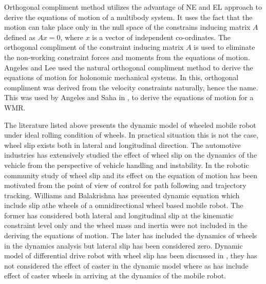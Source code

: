 Orthogonal compliment method utilizes the advantage of NE and EL approach to derive the equations of motion of  a multibody  system.  It uses the fact that the motion can take place only in the null space of the constrains inducing matrix $A$ defined as $Ax=0$, where $x$ is a vector of independent co-ordinates. The orthogonal compliment of the constraint inducing matrix $A$ is used to eliminate the non-working constraint  forces  and moments from the equations of motion.  Angeles and Lee \cite{angeles1988formulation} used the natural orthogonal compliment method to derive the equations of motion for holonomic mechanical systems. In this,  orthogonal compliment was derived from the velocity constraints naturally, hence the name. This was  used by Angeles \cite{angeles2013fundamentals} and Saha in \cite{saha1989kinematics},\cite{saha1991dynamics} to derive the equations of motion for a WMR. 

  The literature listed above presents the dynamic model of wheeled mobile robot under ideal rolling condition of wheels. In practical situation this is not the case,  wheel slip exists both in lateral and longitudinal direction. The automotive industries  has extensively studied the effect of wheel slip on the dynamics of the vehicle from the perspective of vehicle handling and instability. In the robotic community study of wheel slip and its effect on the equation of motion has been motivated from the point of view of control for path following  and trajectory tracking.  Williams\cite{williams2002dynamic}  and Balakrishna  \cite{balakrishna1995modeling} has presented dynamic equation which include slip athe wheels  of a omnidirectional wheel based mobile robot. The former has considered both lateral and longitudinal slip at the kinematic  constraint level only and  the wheel mass and inertia were not included in the deriving the equations of motion. The later has included the dynamics of  wheels in the dynamics analysis but lateral slip  has been considered zero. Dynamic model of differential drive robot with wheel slip has been discussed in \cite{tian2009modeling},\cite{sidek2008dynamic}  they has not considered the effect of caster in the dynamic model where as \cite{konduri2014effect} has include effect of caster wheels in arriving at the dynamics of the mobile robot.

